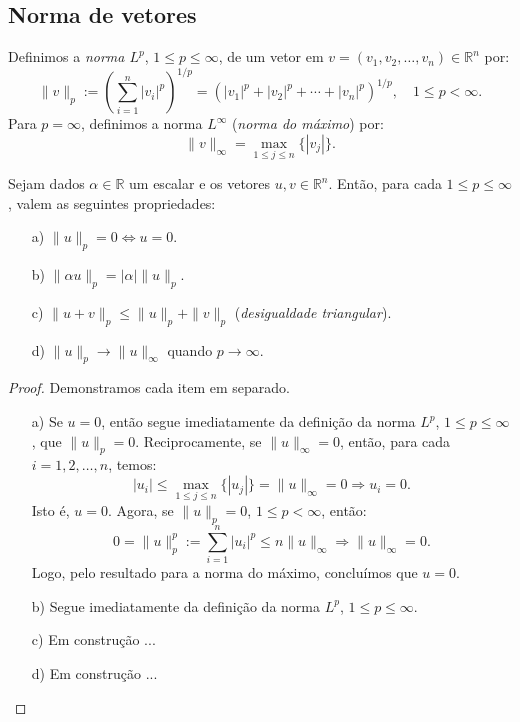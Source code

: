 \subsection{Norma de vetores}

Definimos a \emph{norma $L^p$}, $1 \leq p \leq \infty$, de um vetor em $v = (v_1, v_2, \ldots, v_n)\in \mathbb{R}^n$ por:
\begin{equation*}
  \|v\|_p := \left(\sum_{i=1}^n |v_i|^p\right)^{1/p} = \left(|v_1|^p+|v_2|^p+ \cdots + |v_n|^p\right)^{1/p},\quad 1\leq p < \infty.
\end{equation*}
Para $p=\infty$, definimos a norma $L^{\infty}$ (\emph{norma do máximo}) por:
\begin{equation*}
  \|v\|_\infty = \max_{1\leq j\leq n} \{|v_j|\}.
\end{equation*}

\begin{prop}
  Sejam dados $\alpha\in\mathbb{R}$ um escalar e os vetores $u,v\in\mathbb{R}^n$. Então, para cada $1\leq p \leq \infty$, valem as seguintes propriedades:
  \begin{itemize}
  \item[a)] $\|u\|_p = 0 \Leftrightarrow u = 0$.
  \item[b)] $\|\alpha u\|_p = |\alpha|\|u\|_p$.
  \item[c)] $\|u + v\|_p \leq \|u\|_p + \|v\|_p$ (\emph{desigualdade triangular}).
  \item[d)] $\|u\|_p\to\|u\|_\infty$ quando $p\to\infty$.
  \end{itemize}
\end{prop}
\begin{proof} Demonstramos cada item em separado.
  \begin{itemize}
  \item[a)] Se $u = 0$, então segue imediatamente da definição da norma $L^p$, $1\leq p \leq \infty$, que $\|u\|_p = 0$. Reciprocamente, se  $\|u\|_\infty = 0$, então, para cada $i=1, 2, \ldots, n$, temos:
    \begin{equation*}
      |u_i| \leq \max_{1\leq j \leq n}\{|u_j|\} = \|u\|_{\infty} = 0\Rightarrow u_i = 0.
    \end{equation*}
Isto é, $u = 0$. Agora, se $\|u\|_p = 0$, $1\leq p < \infty$, então:
\begin{equation*}
  0 = \|u\|_p^p := \sum_{i=1}^n |u_i|^p \leq n\|u\|_\infty \Rightarrow  \|u\|_\infty = 0.
\end{equation*}
Logo, pelo resultado para a norma do máximo, concluímos que $u=0$.
\item[b)] Segue imediatamente da definição da norma $L^p$, $1\leq p \leq \infty$. 
\item[c)] Em construção ...
\item[d)] Em construção ...
\end{itemize}
\end{proof}

